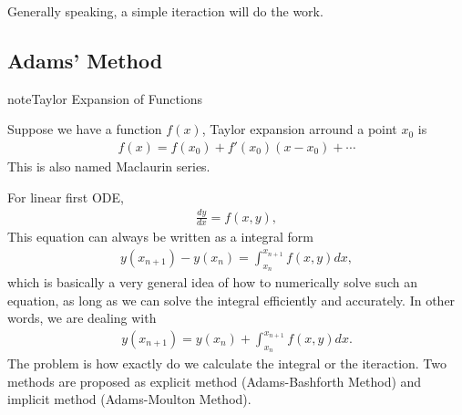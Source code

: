\documentclass[letterpaper,12pt,english]{sphinxmanual}
\begin{document}
Generally speaking, a simple iteraction will do the work.


\subsection{Adams' Method}
\label{\detokenize{finite-difference/ode/adams::doc}}\label{\detokenize{finite-difference/ode/adams:adams-method}}
\begin{sphinxadmonition}{note}{Taylor Expansion of Functions}

Suppose we have a function \(f(x)\), Taylor expansion arround a point \(x_0\) is
\begin{equation*}
\begin{split}f(x) = f(x_0) + f'(x_0) (x - x_0) + \cdots\end{split}
\end{equation*}
This is also named Maclaurin series.
\end{sphinxadmonition}

For linear first ODE,
\begin{equation*}
\begin{split}\frac{dy}{dx} = f(x, y),\end{split}
\end{equation*}
This equation can always be written as a integral form
\begin{equation*}
\begin{split}y(x_{n+1}) - y(x_n) = \int_{x_n}^{x_{n+1}} f(x,y) dx,\end{split}
\end{equation*}
which is basically a very general idea of how to numerically solve such an equation, as long as we can solve the integral efficiently and accurately. In other words, we are dealing with
\begin{equation*}
\begin{split}y(x_{n+1}) =  y(x_n) + \int_{x_n}^{x_{n+1}} f(x,y) dx.\end{split}
\end{equation*}
The problem is how exactly do we calculate the integral or the iteraction. Two methods are proposed as explicit method (Adams-Bashforth Method) and implicit method (Adams-Moulton Method).
\end{document}
